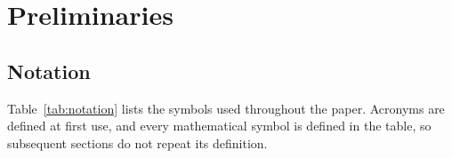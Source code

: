 \section{Preliminaries}
\label{sec:preliminaries}

\subsection{Notation}
Table~\ref{tab:notation} lists the symbols used throughout the paper. Acronyms are defined at first use, and every mathematical symbol is defined in the table, so subsequent sections do not repeat its definition.

